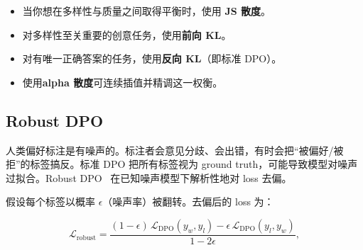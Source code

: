 \begin{keybox}
\begin{itemize}
  \item 当你想在多样性与质量之间取得平衡时，使用 \textbf{JS 散度}。
  \item 对多样性至关重要的创意任务，使用\textbf{前向 KL}。
  \item 对有唯一正确答案的任务，使用\textbf{反向 KL}（即标准 DPO）。
  \item 使用\textbf{alpha 散度}可连续插值并精调这一权衡。
\end{itemize}
\end{keybox}

\subsection{Robust DPO}
\label{sec:robust-dpo}

\begin{intuitionbox}[偏好数据中的噪声标签]
人类偏好标注是有噪声的。标注者会意见分歧、会出错，有时会把“被偏好/被拒”的标签搞反。标准 DPO 把所有标签视为 ground truth，可能导致模型对噪声过拟合。Robust DPO~\cite{chowdhury2024robustdpo} 在已知噪声模型下解析性地对 loss 去偏。
\end{intuitionbox}

假设每个标签以概率 $\epsilon$（噪声率）被翻转。去偏后的 loss 为：

\[
\boxed{
    \mathcal{L}_{\text{robust}} =
    \frac{(1-\epsilon)\,\mathcal{L}_{\text{DPO}}(y_w, y_l)
          - \epsilon\,\mathcal{L}_{\text{DPO}}(y_l, y_w)}{1 - 2\epsilon},
  }
\]


